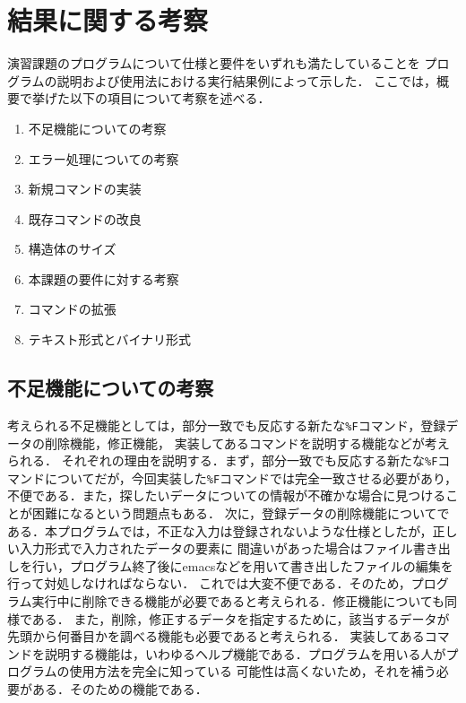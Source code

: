 \documentclass[a4paper,11pt]{jarticle}
\begin{document}
\section{結果に関する考察}

演習課題のプログラムについて仕様と要件をいずれも満たしていることを
プログラムの説明および使用法における実行結果例によって示した．
ここでは，概要で挙げた以下の項目について考察を述べる．

\begin{enumerate}
\setlength{\parskip}{2pt} \setlength{\itemsep}{2pt}
    \item 不足機能についての考察
    \item エラー処理についての考察
    \item 新規コマンドの実装
    \item 既存コマンドの改良
    \item 構造体のサイズ
    \item 本課題の要件に対する考察
    \item コマンドの拡張
    \item テキスト形式とバイナリ形式
\end{enumerate}

\subsection{不足機能についての考察}

考えられる不足機能としては，部分一致でも反応する新たな\verb|%F|コマンド，登録データの削除機能，修正機能，
実装してあるコマンドを説明する機能などが考えられる．
それぞれの理由を説明する．まず，部分一致でも反応する新たな\verb|%F|コマンドについてだが，今回実装した\verb|%F|コマンドでは完全一致させる必要があり，不便である．また，探したいデータについての情報が不確かな場合に見つけることが困難になるという問題点もある．
次に，登録データの削除機能についてである．本プログラムでは，不正な入力は登録されないような仕様としたが，正しい入力形式で入力されたデータの要素に
間違いがあった場合はファイル書き出しを行い，プログラム終了後にemacsなどを用いて書き出したファイルの編集を行って対処しなければならない．
これでは大変不便である．そのため，プログラム実行中に削除できる機能が必要であると考えられる．修正機能についても同様である．
また，削除，修正するデータを指定するために，該当するデータが先頭から何番目かを調べる機能も必要であると考えられる．
実装してあるコマンドを説明する機能は，いわゆるヘルプ機能である．プログラムを用いる人がプログラムの使用方法を完全に知っている
可能性は高くないため，それを補う必要がある．そのための機能である．
\end{document}
